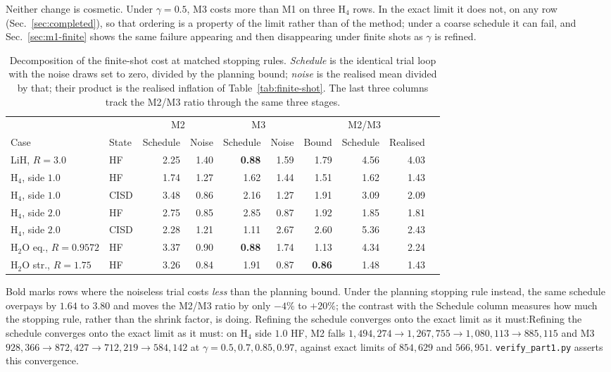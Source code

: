 \documentclass[10pt]{article}
\begin{document}
Neither change is cosmetic. Under $\gamma=0.5$, M3 costs more than M1 on three
H$_4$ rows. In the exact limit it does not, on any row
(Sec.~\ref{sec:completed}), so that ordering is a property of the limit rather
than of the method; under a coarse schedule it can fail, and
Sec.~\ref{sec:m1-finite} shows the same failure appearing and then disappearing
under finite shots as $\gamma$ is refined.

\begin{table}[!htbp]
\centering
\scriptsize
\caption{Decomposition of the finite-shot cost at matched stopping rules. \emph{Schedule} is the identical trial loop with the noise draws set to zero, divided by the planning bound; \emph{noise} is the realised mean divided by that; their product is the realised inflation of Table~\ref{tab:finite-shot}. The last three columns track the M2/M3 ratio through the same three stages.}
\label{tab:shrink}
\begin{tabular}{llrrrrrrrr}
\toprule
& & \multicolumn{2}{c}{M2} & \multicolumn{2}{c}{M3} & \multicolumn{3}{c}{M2/M3} \\
\cmidrule(lr){3-4}\cmidrule(lr){5-6}\cmidrule(lr){7-9}
Case & State & Schedule & Noise & Schedule & Noise & Bound & Schedule & Realised \\
\midrule
LiH, $R{=}3.0$ & HF & 2.25 & 1.40 & \textbf{0.88} & 1.59 & 1.79 & 4.56 & 4.03 \\
H$_4$, side $1.0$ & HF & 1.74 & 1.27 & 1.62 & 1.44 & 1.51 & 1.62 & 1.43 \\
H$_4$, side $1.0$ & CISD & 3.48 & 0.86 & 2.16 & 1.27 & 1.91 & 3.09 & 2.09 \\
H$_4$, side $2.0$ & HF & 2.75 & 0.85 & 2.85 & 0.87 & 1.92 & 1.85 & 1.81 \\
H$_4$, side $2.0$ & CISD & 2.28 & 1.21 & 1.11 & 2.67 & 2.60 & 5.36 & 2.43 \\
H$_2$O eq., $R{=}0.9572$ & HF & 3.37 & 0.90 & \textbf{0.88} & 1.74 & 1.13 & 4.34 & 2.24 \\
H$_2$O str., $R{=}1.75$ & HF & 3.26 & 0.84 & 1.91 & 0.87 & \textbf{0.86} & 1.48 & 1.43 \\
\bottomrule
\end{tabular}
\end{table}

Bold marks rows where the noiseless trial costs \emph{less} than the planning
bound. Under the planning stopping rule instead, the same schedule overpays by
$1.64$ to $3.80$ and moves the M2/M3 ratio by only $-4\%$ to $+20\%$; the
contrast with the Schedule column measures how much the stopping rule, rather
than the shrink factor, is doing. Refining the schedule converges onto the exact
limit as it must:Refining the schedule converges onto the exact limit as it must: on H$_4$ side
$1.0$ HF, M2 falls $1{,}494{,}274\to1{,}267{,}755\to1{,}080{,}113\to885{,}115$
and M3 $928{,}366\to872{,}427\to712{,}219\to584{,}142$ at
$\gamma=0.5,0.7,0.85,0.97$, against exact limits of $854{,}629$ and $566{,}951$.
\texttt{verify\_part1.py} asserts this convergence.
\end{document}
